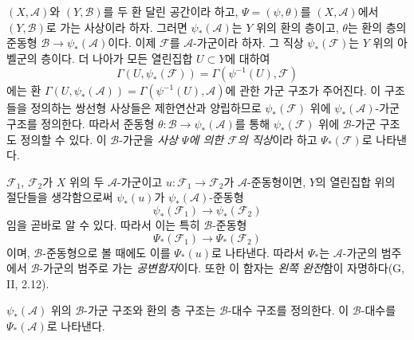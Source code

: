 \begin{env}[4.2.1]
\label{0.4.2.1-ko}
$(X,\mathcal A)$와 $(Y,\mathcal B)$를 두 환 달린 공간이라 하고,
$\Psi=(\psi,\theta)$를
$(X,\mathcal A)$에서 $(Y,\mathcal B)$로 가는 사상이라 하자.
그러면 $\psi_*(\mathcal A)$는 $Y$ 위의 환의 층이고,
$\theta$는 환의 층의 준동형
$\mathcal B\to\psi_*(\mathcal A)$이다.
이제 $\mathcal F$를 $\mathcal A$-가군이라 하자. 그 직상
$\psi_*(\mathcal F)$는 $Y$ 위의 아벨군의 층이다. 더 나아가 모든
열린집합 $U\subset Y$에 대하여
\[
  \Gamma(U,\psi_*(\mathcal F))
  =\Gamma(\psi^{-1}(U),\mathcal F)
\]
에는 환
$\Gamma(U,\psi_*(\mathcal A))=\Gamma(\psi^{-1}(U),\mathcal A)$에
관한 가군 구조가 주어진다. 이 구조들을 정의하는 쌍선형 사상들은
제한연산과 양립하므로 $\psi_*(\mathcal F)$ 위에
$\psi_*(\mathcal A)$-가군 구조를 정의한다. 따라서 준동형
$\theta:\mathcal B\to\psi_*(\mathcal A)$를 통해
$\psi_*(\mathcal F)$ 위에 $\mathcal B$-가군 구조도 정의할 수 있다.
이 $\mathcal B$-가군을 
\emph{사상 $\Psi$에 의한 $\mathcal F$의 직상}이라 하고
$\Psi_*(\mathcal F)$로 나타낸다.

$\mathcal F_1$, $\mathcal F_2$가 $X$ 위의 두 $\mathcal A$-가군이고
$u:\mathcal F_1\to\mathcal F_2$가 $\mathcal A$-준동형이면,
$Y$의 열린집합 위의 절단들을 생각함으로써 $\psi_*(u)$가
$\psi_*(\mathcal A)$-준동형
\[
  \psi_*(\mathcal F_1)\longrightarrow\psi_*(\mathcal F_2)
\]
임을 곧바로 알 수 있다. 따라서 이는 특히 $\mathcal B$-준동형
\[
  \Psi_*(\mathcal F_1)\longrightarrow\Psi_*(\mathcal F_2)
\]
이며, $\mathcal B$-준동형으로 볼 때에도 이를 $\Psi_*(u)$로 나타낸다.
따라서 $\Psi_*$는 $\mathcal A$-가군의 범주에서
$\mathcal B$-가군의 범주로 가는 
\emph{공변함자}이다. 또한 이 함자는 
\emph{왼쪽 완전}함이 자명하다(G, II, 2.12).

$\psi_*(\mathcal A)$ 위의 $\mathcal B$-가군 구조와 환의 층 구조는
$\mathcal B$-대수 구조를 정의한다. 이 $\mathcal B$-대수를
$\Psi_*(\mathcal A)$로 나타낸다.
\end{env}

